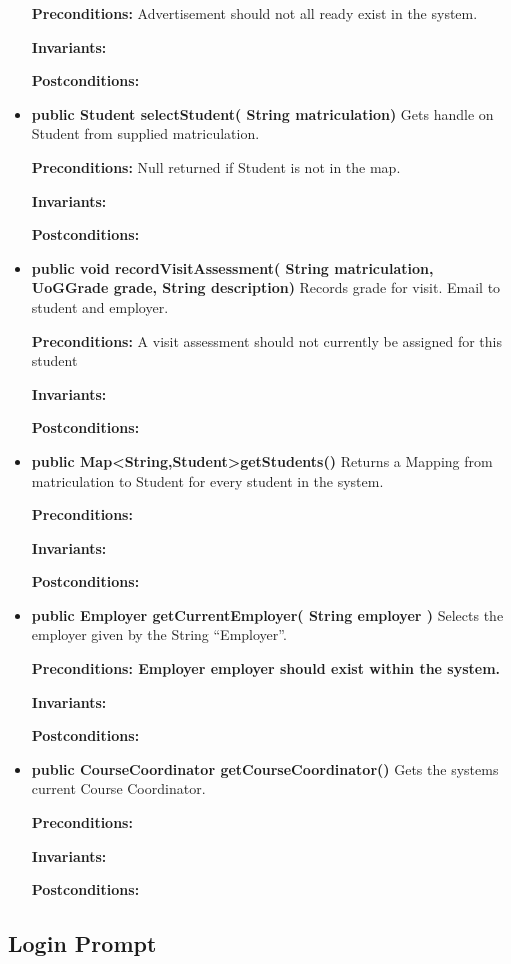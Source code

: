\documentclass[11pt]{l3deliverable}
\begin{document}
\begin{itemize}
{\textbf{Preconditions:} Advertisement should not all ready exist in the
  system.

\textbf{Invariants:} 

\textbf{Postconditions:} }
\item{\textbf{public Student selectStudent( String matriculation)}
Gets handle on Student from supplied matriculation.

\textbf{Preconditions:} Null returned if Student is not in the map.

\textbf{Invariants:} 

\textbf{Postconditions:} }
\item{\textbf{public void recordVisitAssessment( String matriculation,
    UoGGrade grade, String description)}
Records grade for visit. Email to student and employer.

\textbf{Preconditions:} A visit assessment should not currently be
  assigned for this student

\textbf{Invariants:} 

\textbf{Postconditions:} }
\item{\textbf{public Map<String,Student>getStudents()}
Returns a Mapping from matriculation to Student for every student in
the system.

\textbf{Preconditions:}

\textbf{Invariants:} 

\textbf{Postconditions:} }
\item{\textbf{public Employer getCurrentEmployer( String employer )}
Selects the employer given by the String ``Employer''.

\textbf{Preconditions: Employer employer should exist within the
  system.}

\textbf{Invariants:} 

\textbf{Postconditions:} }
\item{\textbf{public CourseCoordinator getCourseCoordinator() }
Gets the systems current Course Coordinator.

\textbf{Preconditions: }

\textbf{Invariants:} 

\textbf{Postconditions:} }


\end{itemize}

\subsection{Login Prompt}
\end{document}
